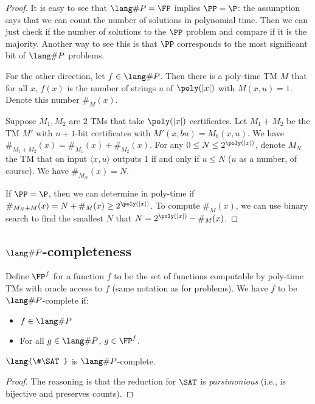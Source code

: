 \begin{proof}
It is easy to see that $\SharpP = \FP$ implies $\PP = \P$: the assumption says that we can count the number of solutions in polynomial time. Then we can just check if the number of solutions to the $\PP$ problem and compare if it is the majority. Another way to see this is that $\PP$ corresponds to the most significant bit of $\SharpP$ problems.

\par For the other direction, let $f \in \SharpP$. Then there is a poly-time TM $M$ that for all $x$, $f(x)$ is the number of strings $u$ of $\poly(|x|)$ with $M(x, u) = 1$. Denote this number $\#_M(x)$. 

\par Suppose $M_1, M_2$ are 2 TMs that take $\poly(|x|)$ certificates. Let $M_1 + M_2$ be the TM $M'$ with $n+1$-bit certificates with $M'(x, bu) = M_b(x, u)$. We have $\#_{M_1 + M_2}(x) = \#_{M_1}(x) + \#_{M_2}(x)$. For any $0 \le N \le 2^{\poly(|x|)}$, denote $M_N$ the TM that on input $\langle x, u \rangle$ outputs 1 if and only if $u \le N$ ($u$ as a number, of course). We have $\#_{M_N}(x) = N$. 

\par If $\PP = \P$, then we can determine in poly-time if $\#_{M_N + M}(x) = N + \#_{M}(x) \ge 2^{\poly(|x|)}$. To compute $\#_M(x)$, we can use binary search to find the smallest $N$ that $N = 2^{\poly(|x|)} - \#_M(x)$. 
\end{proof}

\subsection{$\SharpP$-completeness}
\begin{definition}
Define $\FP^{f}$ for a function $f$ to be the set of functions computable by poly-time TMs with oracle access to $f$ (same notation as for problems). We have $f$ to be $\SharpP$-complete if:
\begin{itemize}
\item $f \in \SharpP$
\item For all $g \in \SharpP$, $g \in \FP^{f}$.
\end{itemize}
\end{definition}

\newcommand{\SharpSAT}{\lang{\#\SAT}}
\begin{theorem}
$\SharpSAT$ is $\SharpP$-complete.
\end{theorem}

\begin{proof}
The reasoning is that the reduction for $\SAT$ is \emph{parsimonious} (i.e., is bijective and preserves counts). 
\end{proof}

